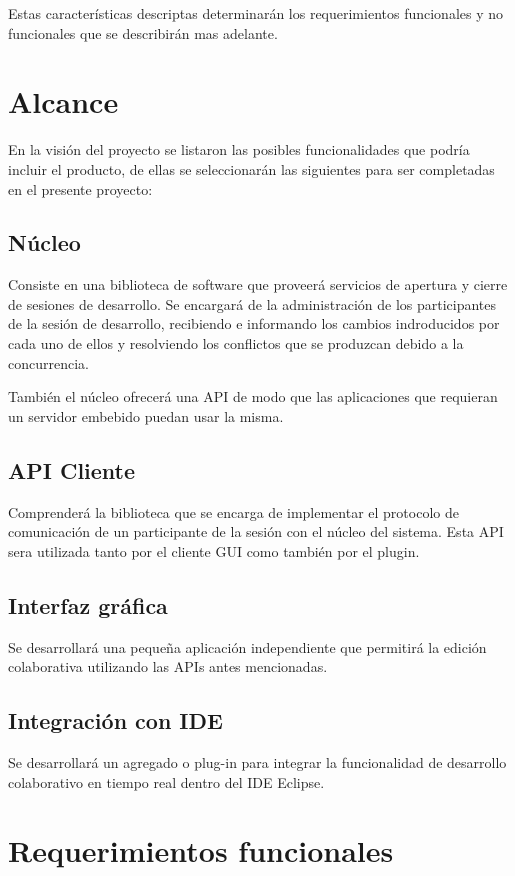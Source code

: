 \documentclass[12pt,a4paper]{article}
\begin{document}
Estas características descriptas determinarán los requerimientos funcionales y no funcionales que se describirán mas adelante.

	\section{Alcance}
   En la visión del proyecto se listaron las posibles funcionalidades que podría incluir el producto, de ellas se seleccionarán las siguientes para ser completadas en el presente proyecto:
   
	\subsection{Núcleo}
	Consiste en una biblioteca de software que proveerá servicios de apertura y cierre de sesiones de desarrollo. Se encargará de la administración de los participantes de la sesión de desarrollo, recibiendo e informando los cambios indroducidos por cada uno de ellos y resolviendo los conflictos que se produzcan debido a la concurrencia.
	
	También el núcleo ofrecerá una API de modo que las aplicaciones que requieran un servidor embebido puedan usar la misma.

	\subsection{API Cliente}
	Comprenderá la biblioteca que se encarga de implementar el protocolo de comunicación de un participante de la sesión con el núcleo del sistema. Esta API sera utilizada tanto por el cliente GUI como también por el plugin.

	\subsection{Interfaz gráfica}
	Se desarrollará una pequeña aplicación independiente que permitirá la edición colaborativa utilizando las APIs antes mencionadas.

	\subsection{Integración con IDE}
	Se desarrollará un agregado o plug-in para integrar la funcionalidad de desarrollo colaborativo en tiempo real dentro del IDE Eclipse.

	\section{Requerimientos funcionales}
	
\end{document}
